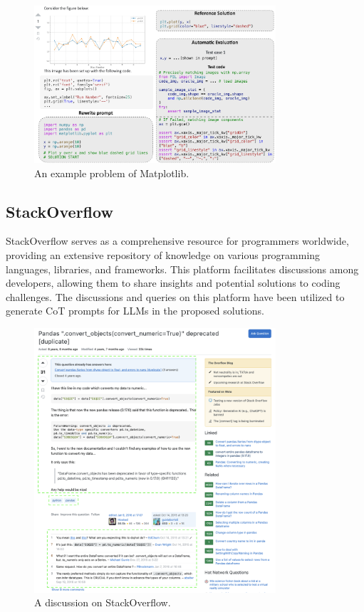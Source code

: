 \documentclass[a4paper,oneside]{book}
\begin{document}
\begin{figure}[H]
    \centering
    \includegraphics[width=0.8\textwidth]{img/ds1000_example}
    \caption{An example problem of Matplotlib.}\label{fig:ds1000_example}
\end{figure}

\subsection{StackOverflow}
StackOverflow serves as a comprehensive resource for programmers worldwide, providing an extensive repository of knowledge on various programming languages, libraries, and frameworks. This platform facilitates discussions among developers, allowing them to share insights and potential solutions to coding challenges. The discussions and queries on this platform have been utilized to generate CoT prompts for LLMs in the proposed solutions.

\begin{figure}[H]
    \centering
    \includegraphics[width=0.8\textwidth]{img/stackoverflow}
    \caption{A discussion on StackOverflow.}\label{fig:stackoverflow}
\end{figure}
\end{document}
